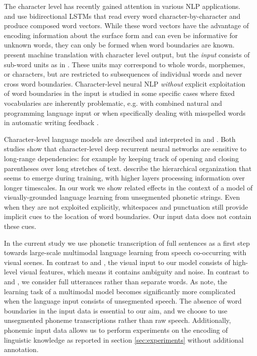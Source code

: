 The character level has recently gained attention in various NLP applications.  and  use bidirectional LSTMs that read every word character-by-character and produce composed word vectors. While these word vectors have the advantage of encoding information about the surface form and can even be informative for unknown words, they can only be formed when word boundaries are known. %
 present machine translation with character level output, but the \textit{input} consists of sub-word units as in . These units may correspond to whole words, morphemes, or characters, but are restricted to subsequences of individual words and never cross word boundaries. Character-level neural NLP \textit{without} explicit exploitation of word boundaries in the input is studied in some specific cases where fixed vocabularies are inherently problematic, e.g. with combined natural and programming language input \cite{chrupala2013text} or when specifically dealing with misspelled words in automatic writing feedback \cite{xie2016neural}. 

Character-level language models are described and interpreted in  and . Both studies show that character-level deep recurrent neural networks are sensitive to long-range dependencies: for example by keeping track of opening and closing parentheses over long stretches of text.  describe the hierarchical organization that seems to emerge during training, with higher layers processing information over longer timescales. In our work we show related effects in the context of a model of visually-grounded language learning from unsegmented phonetic strings. Even when they are not exploited explicitly, whitespaces and punctuation still provide implicit cues to the location of word boundaries. Our input data does not contain these cues.

In the current study we use phonetic transcription of full sentences as a first step towards large-scale multimodal language learning from speech co-occurring with visual scenes. In contrast to  and , the visual input to our model consists of high-level visual features, which means it contains ambiguity and noise. In contrast to  and , we consider full utterances rather than separate words. As  note, the learning task of a multimodal model becomes significantly more complicated when the language input consists of unsegmented speech. The absence of word boundaries in the input data is essential to our aim, and we choose to use unsegmented phoneme transcriptions rather than raw speech. Additionally, phonemic input data allows us to perform experiments on the encoding of linguistic knowledge as reported in section \ref{sec:experiments} without additional annotation.

